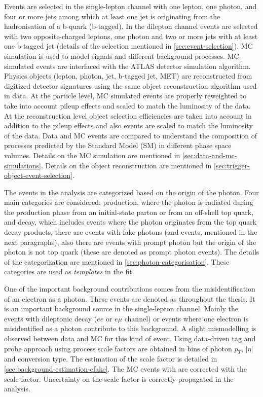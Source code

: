 Events are selected in the single-lepton channel with one lepton, one photon, and four or more jets among which at least one jet is originating from the hadronisation of a b-quark (b-tagged). In the dilepton channel events are selected with two opposite-charged leptons, one photon and two or more jets with at least one b-tagged jet (details of the selection mentioned in \cref{sec:event-selection}). MC simulation is used to model signals and different background processes. MC-simulated events are interfaced with the ATLAS detector simulation algorithm. Physics objects (lepton, photon, jet, b-tagged jet, MET) are reconstructed from digitized detector signatures using the same object reconstruction algorithm used in data. At the particle level, MC simulated events are properly reweighted to take into account pileup effects and scaled to match the luminosity of the data. At the reconstruction level object selection efficiencies are taken into account in addition to the pileup effects and also events are scaled to match the luminosity of the data. Data and MC events are compared to understand the composition of processes predicted by the Standard Model (SM) in different phase space volumes. Details on the MC simulation are mentioned in \cref{sec:data-and-mc-simulations}. Details on the object reconstruction are mentioned in \cref{sec:trigger-object-event-selection}.


The events in the analysis are categorized based on the origin of the photon. Four main categories are considered: \tty production, where the photon is radiated during the production phase from an initial-state parton or from an off-shell top quark, and \tty decay, which includes events where the photon originates from the top quark decay products, there are events with fake photons (\efake and \hfake events, mentioned in the next paragraphs), also there are events with prompt photon but the origin of the photon is not top quark (these are denoted as prompt photon events). The details of the categorization are mentioned in \cref{sec:photon-categorisation}. These categories are used as \textit{templates} in the fit.

One of the important background contributions comes from the misidentification of an electron as a photon. These events are denoted as \efake throughout the thesis. It is an important background source in the single-lepton channel. Mainly the \ttbar events with dileptonic decay ($ee$ or $e\mu$ channel) or \zee events where one electron is misidentified as a photon contribute to this background. A slight mismodelling is observed between data and MC for this kind of event. Using data-driven tag and probe approach using \zee process scale factors are obtained in bins of photon $p_T$, $|\eta|$ and conversion type. The estimation of the scale factor is detailed in \cref{sec:background-estimation-efake}. The MC events with \efake are corrected with the scale factor. Uncertainty on the scale factor is correctly propagated in the analysis.

